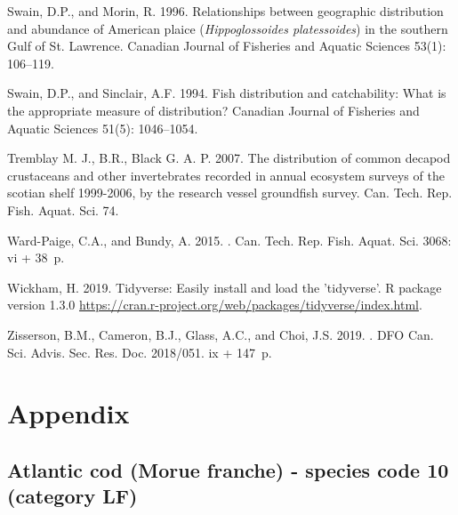 \documentclass[12pt]{article}\usepackage[]{graphicx}\usepackage[]{color}
\begin{document}
\begin{CSLReferences}{1}{0}
\leavevmode\hypertarget{ref-Swain:Morin:1996:cjfas}{}%
Swain, D.P., and Morin, R. 1996. Relationships between geographic distribution and abundance of {A}merican plaice (\emph{{H}ippoglossoides platessoides}) in the southern {G}ulf of {S}t. {L}awrence. Canadian Journal of Fisheries and Aquatic Sciences 53(1): 106--119.

\leavevmode\hypertarget{ref-Swain:Sinclair:1994:cjfas}{}%
Swain, D.P., and Sinclair, A.F. 1994. Fish distribution and catchability: {W}hat is the appropriate measure of distribution? Canadian Journal of Fisheries and Aquatic Sciences 51(5): 1046--1054.

\leavevmode\hypertarget{ref-Tremblayetal:2007}{}%
Tremblay M. J., B.R., Black G. A. P. 2007. The distribution of common decapod crustaceans and other invertebrates recorded in annual ecosystem surveys of the scotian shelf 1999-2006, by the research vessel groundfish survey. Can. Tech. Rep. Fish. Aquat. Sci. 74.

\leavevmode\hypertarget{ref-WardPaige2016}{}%
Ward-Paige, C.A., and Bundy, A. 2015. . Can. Tech. Rep. Fish. Aquat. Sci. 3068: vi + 38~p.

\leavevmode\hypertarget{ref-R:Tidyverse}{}%
Wickham, H. 2019. Tidyverse: Easily install and load the 'tidyverse'. R package version 1.3.0 \url{https://cran.r-project.org/web/packages/tidyverse/index.html}.

\leavevmode\hypertarget{ref-Zisserson2019}{}%
Zisserson, B.M., Cameron, B.J., Glass, A.C., and Choi, J.S. 2019. . DFO Can. Sci. Advis. Sec. Res. Doc. 2018/051. ix + 147~p.

\end{CSLReferences}
\pagebreak

\hypertarget{appendix}{%
\section{Appendix}\label{appendix}}

\pagebreak 

\renewcommand\thefigure{\thesubsection\Alph{figure}}

\setcounter{figure}{0}

\hypertarget{sec:10}{%
\subsection{Atlantic cod (Morue franche) - species code 10 (category LF)}\label{sec:10}}
\end{document}
